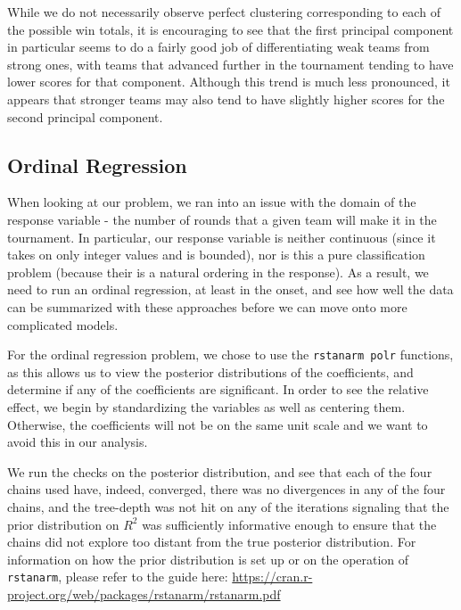 \documentclass[10pt,a4paper, hidelinks]{article} %
\begin{document}
While we do not necessarily observe perfect clustering corresponding to each of the possible win totals, it is encouraging to see that the first principal component in particular seems to do a fairly good job of differentiating weak teams from strong ones, with teams that advanced further in the tournament tending to have lower scores for that component. Although this trend is much less pronounced, it appears that stronger teams may also tend to have slightly higher scores for the second principal component. 


\subsection{Ordinal Regression}

When looking at our problem, we ran into an issue with the domain of the response variable - the number of rounds that a given team will make it in the tournament. In particular, our response variable is neither continuous (since it takes on only integer values and is bounded), nor is this a pure classification problem (because their is a natural ordering in the response). As a result, we need to run an ordinal regression, at least in the onset, and see how well the data can be summarized with these approaches before we can move onto more complicated models. 

For the ordinal regression problem, we chose to use the \texttt{rstanarm polr} functions, as this allows us to view the posterior distributions of the coefficients, and determine if any of the coefficients are significant. In order to see the relative effect, we begin by standardizing the variables as well as centering them. Otherwise, the coefficients will not be on the same unit scale and we want to avoid this in our analysis.

We run the checks on the posterior distribution, and see that each of the four chains used have, indeed, converged, there was no divergences in any of the four chains, and the tree-depth was not hit on any of the iterations signaling that the prior distribution on $R^2$ was sufficiently informative enough to ensure that the chains did not explore too distant from the true posterior distribution. For information on how the prior distribution is set up or on the operation of \texttt{rstanarm}, please refer to the guide here: {\color{blue} \url{https://cran.r-project.org/web/packages/rstanarm/rstanarm.pdf}}
\end{document}
